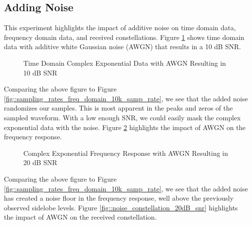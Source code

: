 \documentclass{article}
\begin{document}
\subsection{Adding Noise}

This experiment highlights the impact of additive noise on time domain data, frequency domain data, and received constellations. Figure \ref{fig::noise_time_domain_10dB_snr} shows time domain data with additive white Gaussian noise (AWGN) that results in a 10 dB SNR.

\begin{figure}[H]
	\centerline{}
	\caption{Time Domain Complex Exponential Data with AWGN Resulting in 10 dB SNR}
	\label{fig::noise_time_domain_10dB_snr}
\end{figure}

Comparing the above figure to Figure \ref{fig::sampling_rates_freq_domain_10k_samp_rate}, we see that the added noise randomizes our samples. This is most apparent in the peaks and zeros of the sampled waveform. With a low enough SNR, we could easily mask the complex exponential data with the noise. Figure \ref{fig::noise_freq_domain_20dB_snr} highlights the impact of AWGN on the frequency response.

\begin{figure}[H]
	\centerline{}
	\caption{Complex Exponential Frequency Response with AWGN Resulting in 20 dB SNR}
	\label{fig::noise_freq_domain_20dB_snr}
\end{figure}

Comparing the above figure to Figure \ref{fig::sampling_rates_freq_domain_10k_samp_rate}, we see that the added noise has created a noise floor in the frequency response, well above the previously observed sidelobe levels. Figure \ref{fig::noise_constellation_20dB_snr} highlights the impact of AWGN on the received constellation.
\end{document}
